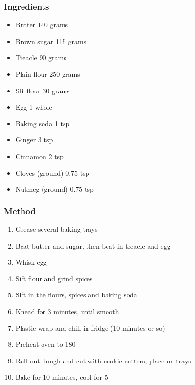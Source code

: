 \documentclass[]{article}
\begin{document}
\subsubsection*{\Large Ingredients}
\begin{multicols}{2}
\begin{itemize}
 \item Butter \hfill 140 grams
 \item Brown sugar \hfill 115 grams
 \item Treacle \hfill 90 grams
 \item Plain flour \hfill 250 grams
 \item SR flour \hfill 30 grams
 \item Egg \hfill 1 whole
 \item Baking soda \hfill 1 tsp
 \item Ginger \hfill 3 tsp
 \item Cinnamon \hfill 2 tsp
 \item Cloves (ground) \hfill 0.75 tsp
 \item Nutmeg (ground) \hfill 0.75 tsp
\end{itemize}
\end{multicols}
\subsubsection*{\Large Method}
\begin{enumerate}[font=\huge\color{accent}]
	\item Grease several baking trays
	\item Beat butter and sugar, then beat in treacle and egg
	\item Whisk egg
	\item Sift flour and grind spices
	\item Sift in the flours, spices and baking soda
	\item Knead for 3 minutes, until smooth
	\item Plastic wrap and chill in fridge (10 minutes or so)
	\item Preheat oven to 180
	\item Roll out dough and cut with cookie cutters, place on trays
	\item Bake for 10 minutes, cool for 5
\end{enumerate}
\newpage
{}\label{rec:Macadamia and White Choc Biscuits}
\end{document}
